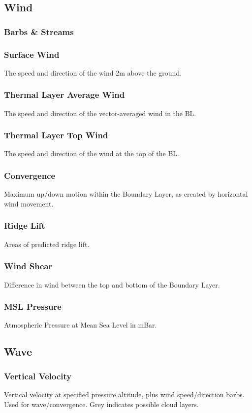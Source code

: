 \documentclass[11pt,a4paper]{article}
\begin{document}
\subsection{Wind}
\subsubsection{Barbs \& Streams}
\subsubsection{Surface Wind}
The speed and direction of the wind 2m above the ground.
\subsubsection{Thermal Layer Average Wind}
The speed and direction of the vector-averaged wind in the BL.
\subsubsection{Thermal Layer Top Wind}
The speed and direction of the wind at the top of the BL.
\subsubsection{Convergence}
Maximum up/down motion within the Boundary Layer, as created by horizontal wind movement.
\subsubsection{Ridge Lift}
Areas of predicted ridge lift.
\subsubsection{Wind Shear}
Difference in wind between the top and bottom of the Boundary Layer.
\subsubsection{MSL Pressure}
Atmospheric Pressure at Mean Sea Level in mBar.
\subsection{Wave}
\subsubsection{Vertical Velocity}
Vertical velocity at specified pressure altitude, plus wind speed/direction barbs. Used for wave/convergence. Grey indicates possible cloud layers.
\end{document}
